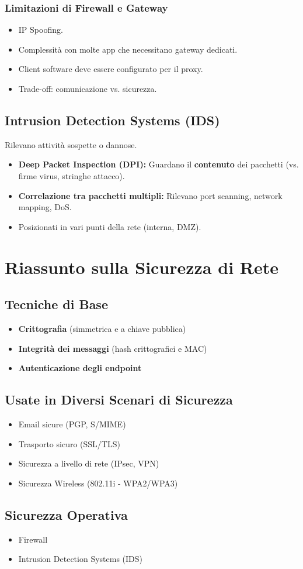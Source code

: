 \subsubsection{Limitazioni di Firewall e Gateway}
\begin{itemize}
    \item IP Spoofing.
    \item Complessità con molte app che necessitano gateway dedicati.
    \item Client software deve essere configurato per il proxy.
    \item Trade-off: comunicazione vs. sicurezza.
\end{itemize}

\subsection{Intrusion Detection Systems (IDS)}
Rilevano attività sospette o dannose.
\begin{itemize}
    \item \textbf{Deep Packet Inspection (DPI):} Guardano il \textbf{contenuto} dei pacchetti (vs. firme virus, stringhe attacco).
    \item \textbf{Correlazione tra pacchetti multipli:} Rilevano port scanning, network mapping, DoS.
    \item Posizionati in vari punti della rete (interna, DMZ).
\end{itemize}

\section{Riassunto sulla Sicurezza di Rete}
\label{sec:riassunto_sicurezza}

\subsection{Tecniche di Base}
\begin{itemize}
    \item \textbf{Crittografia} (simmetrica e a chiave pubblica)
    \item \textbf{Integrità dei messaggi} (hash crittografici e MAC)
    \item \textbf{Autenticazione degli endpoint}
\end{itemize}

\subsection{Usate in Diversi Scenari di Sicurezza}
\begin{itemize}
    \item Email sicure (PGP, S/MIME)
    \item Trasporto sicuro (SSL/TLS)
    \item Sicurezza a livello di rete (IPsec, VPN)
    \item Sicurezza Wireless (802.11i - WPA2/WPA3)
\end{itemize}

\subsection{Sicurezza Operativa}
\begin{itemize}
    \item Firewall
    \item Intrusion Detection Systems (IDS)
\end{itemize}

